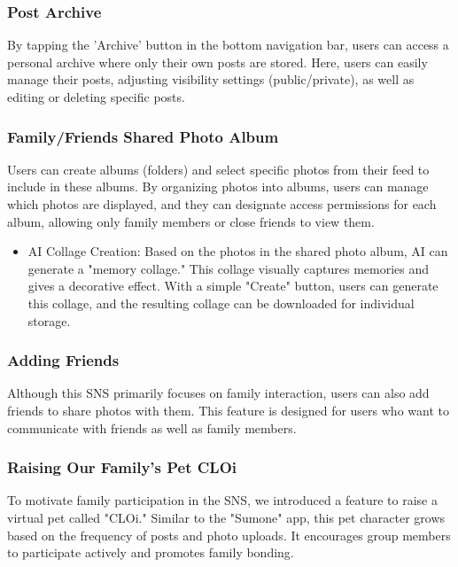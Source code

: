 \documentclass[conference]{IEEEtran}
\begin{document}
        \subsubsection{Post Archive}
            By tapping the 'Archive' button in the bottom navigation bar, users can access a personal archive where only their own posts are stored. Here, users can easily manage their posts, adjusting visibility settings (public/private), as well as editing or deleting specific posts.

        \subsubsection{Family/Friends Shared Photo Album}
            Users can create albums (folders) and select specific photos from their feed to include in these albums. By organizing photos into albums, users can manage which photos are displayed, and they can designate access permissions for each album, allowing only family members or close friends to view them.

            \begin{itemize}
                \item AI Collage Creation: Based on the photos in the shared photo album, AI can generate a "memory collage." This collage visually captures memories and gives a decorative effect. With a simple "Create" button, users can generate this collage, and the resulting collage can be downloaded for individual storage.
            \end{itemize}

        \subsubsection{Adding Friends}
            Although this SNS primarily focuses on family interaction, users can also add friends to share photos with them. This feature is designed for users who want to communicate with friends as well as family members.

        \subsubsection{Raising Our Family's Pet CLOi}
            To motivate family participation in the SNS, we introduced a feature to raise a virtual pet called "CLOi." Similar to the "Sumone" app, this pet character grows based on the frequency of posts and photo uploads. It encourages group members to participate actively and promotes family bonding.
\end{document}
